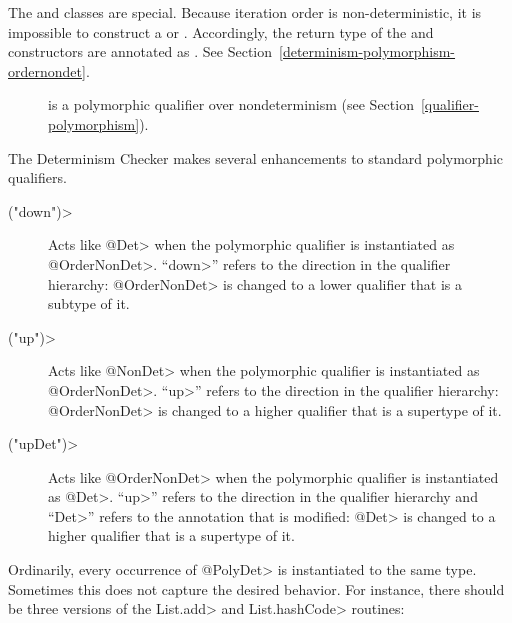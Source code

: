 The  and  classes are special. Because iteration order is
non-deterministic, it is impossible to construct a 
or .
Accordingly, the return type of the  and 
constructors are annotated as . See
Section~\ref{determinism-polymorphism-ordernondet}.


\begin{description}
\item[] is a
  polymorphic qualifier over nondeterminism (see Section~\ref{qualifier-polymorphism}).
\end{description}

The Determinism Checker makes
several enhancements to standard polymorphic qualifiers.



\begin{description}
\item[\<("down")>]
  Acts like \<@Det> when the polymorphic qualifier is instantiated as
  \<@OrderNonDet>.
  ``\<down>'' refers to the direction in the qualifier hierarchy:
  \<@OrderNonDet> is changed to a lower qualifier that is a subtype of it.
\item[\<("up")>]
  Acts like \<@NonDet> when the polymorphic qualifier is instantiated as
  \<@OrderNonDet>.
  ``\<up>'' refers to the direction in the qualifier hierarchy:
  \<@OrderNonDet> is changed to a higher qualifier that is a supertype of it.
\item[\<("upDet")>]
  Acts like \<@OrderNonDet> when the polymorphic qualifier is instantiated as
  \<@Det>.
  ``\<up>'' refers to the direction in the qualifier hierarchy and ``\<Det>''
  refers to the annotation that is modified:
  \<@Det> is changed to a higher qualifier that is a supertype of it.
\end{description}

Ordinarily, every occurrence of \<@PolyDet> is instantiated to the same
type.  Sometimes this does not capture the desired behavior.  For instance,
there should be three versions of the \<List.add> and \<List.hashCode> routines:

